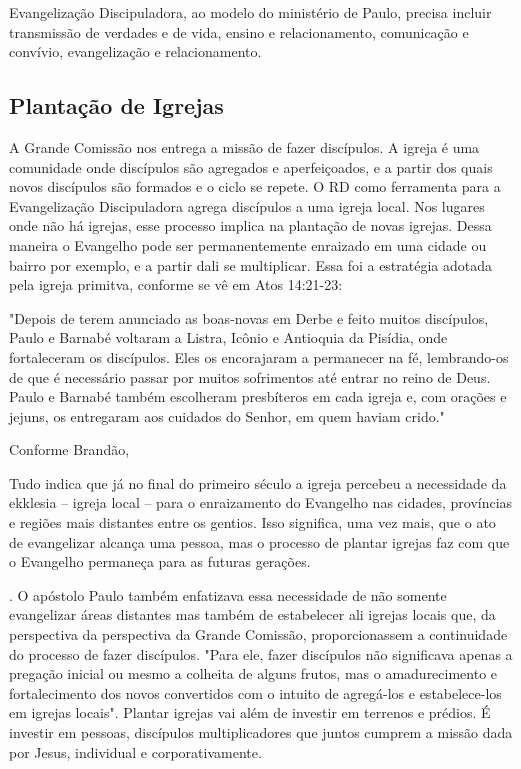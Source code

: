 \documentclass[
	12pt,				%
	openright,			%
	twoside,			%
	a4paper,			%
	english,			%
	french,				%
	spanish,			%
	brazil				%
	]{abntex2}
\begin{document}
Evangelização Discipuladora, ao modelo do ministério de Paulo, precisa incluir transmissão de verdades e de vida, ensino e relacionamento, comunicação e convívio, evangelização e relacionamento.

\subsection{Plantação de Igrejas}

A Grande Comissão nos entrega a missão de fazer discípulos. A igreja é uma comunidade onde discípulos são agregados e aperfeiçoados, e a partir dos quais novos discípulos são formados e o ciclo se repete. O RD como ferramenta para a Evangelização Discipuladora agrega discípulos a uma igreja local. Nos lugares onde não há igrejas, esse processo implica na plantação de novas igrejas. Dessa maneira o Evangelho pode ser permanentemente enraizado em uma cidade ou bairro por exemplo, e a partir dali se multiplicar\cite[99,100]{brandao}. Essa foi a estratégia adotada pela igreja primitva, conforme se vê em Atos 14:21-23: \begin{citacao}"Depois de terem anunciado as boas-novas em Derbe e feito muitos discípulos, Paulo e Barnabé voltaram a Listra, Icônio e Antioquia da Pisídia, onde fortaleceram os discípulos. Eles os encorajaram a permanecer na fé, lembrando-os de que é necessário passar por muitos sofrimentos até entrar no reino de Deus. Paulo e Barnabé também escolheram presbíteros em cada igreja e, com orações e jejuns, os entregaram aos cuidados do Senhor, em quem haviam crido."\end{citacao}
Conforme Brandão, \begin{citacao}Tudo indica que já no final do primeiro século a igreja percebeu a necessidade	da ekklesia – igreja local – para o enraizamento do Evangelho nas cidades,	províncias e regiões mais distantes entre os gentios. Isso significa, uma vez mais,	que o ato de evangelizar alcança uma pessoa, mas o processo de plantar igrejas	faz com que o Evangelho permaneça para as futuras gerações.\end{citacao}\cite[101]{brandao}.	
O apóstolo Paulo também enfatizava essa necessidade de não somente evangelizar áreas distantes mas também de estabelecer ali igrejas locais que, da perspectiva da perspectiva da Grande Comissão, proporcionassem a continuidade do processo de fazer discípulos. "Para ele, fazer discípulos não significava apenas a pregação inicial ou mesmo a colheita de alguns frutos, mas o amadurecimento e fortalecimento dos novos convertidos com o intuito de agregá-los e estabelece-los em igrejas locais"\cite[101]{brandao}. Plantar igrejas vai além de investir em terrenos e prédios. É investir em pessoas, discípulos multiplicadores que juntos cumprem a missão dada por Jesus, individual e corporativamente.
\end{document}
